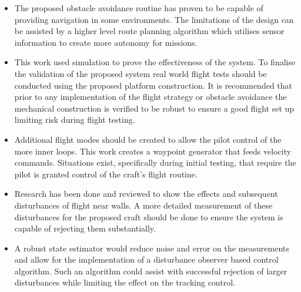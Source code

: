 	\begin{itemize}
		\item The proposed obstacle avoidance routine has proven to be capable of providing navigation in some environments. The limitations of the design can be assisted by a higher level route planning algorithm which utilises sensor information to create more autonomy for missions.

		\item This work used simulation to prove the effectiveness of the system. To finalise the validation of the proposed system real world flight tests should be conducted using the proposed platform construction. It is recommended that prior to any implementation of the flight strategy or obstacle avoidance the mechanical construction is verified to be robust to ensure a good flight set up limiting risk during flight testing.
		
		\item Additional flight modes should be created to allow the pilot control of the more inner loops. This work creates a waypoint generator that feeds velocity commands. Situations exist, specifically during initial testing, that require the pilot is granted control of the craft's flight routine.
		
		\item Research has been done and reviewed to show the effects and subsequent disturbances of flight near walls. A more detailed measurement of these disturbances for the proposed craft should be done to ensure the system is capable of rejecting them substantially. 
		
		\item A robust state estimator would reduce noise and error on the measurements and allow for the implementation of a disturbance observer based control algorithm. Such an algorithm could assist with successful rejection of larger disturbances while limiting the effect on the tracking control.

	\end{itemize}

	
	